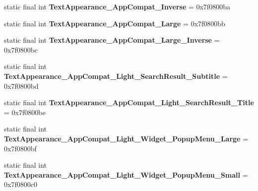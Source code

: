 \begin{DoxyCompactItemize}
\item 
\hypertarget{classandroid_1_1support_1_1design_1_1_r_1_1style_acc2c875b4af6beac9360f42572c25d9a}{}static final int {\bfseries Text\+Appearance\+\_\+\+App\+Compat\+\_\+\+Inverse} = 0x7f0800ba\label{classandroid_1_1support_1_1design_1_1_r_1_1style_acc2c875b4af6beac9360f42572c25d9a}

\item 
\hypertarget{classandroid_1_1support_1_1design_1_1_r_1_1style_ad3d980817c920614b02aac4354be82e7}{}static final int {\bfseries Text\+Appearance\+\_\+\+App\+Compat\+\_\+\+Large} = 0x7f0800bb\label{classandroid_1_1support_1_1design_1_1_r_1_1style_ad3d980817c920614b02aac4354be82e7}

\item 
\hypertarget{classandroid_1_1support_1_1design_1_1_r_1_1style_a12013c3ce690759654e8b1a05327e0c9}{}static final int {\bfseries Text\+Appearance\+\_\+\+App\+Compat\+\_\+\+Large\+\_\+\+Inverse} = 0x7f0800bc\label{classandroid_1_1support_1_1design_1_1_r_1_1style_a12013c3ce690759654e8b1a05327e0c9}

\item 
\hypertarget{classandroid_1_1support_1_1design_1_1_r_1_1style_ab6a60e6b39b2f6c94adbf6523ca0ddf7}{}static final int {\bfseries Text\+Appearance\+\_\+\+App\+Compat\+\_\+\+Light\+\_\+\+Search\+Result\+\_\+\+Subtitle} = 0x7f0800bd\label{classandroid_1_1support_1_1design_1_1_r_1_1style_ab6a60e6b39b2f6c94adbf6523ca0ddf7}

\item 
\hypertarget{classandroid_1_1support_1_1design_1_1_r_1_1style_ad43f8905df9054ea1c5ee01caaa9aae2}{}static final int {\bfseries Text\+Appearance\+\_\+\+App\+Compat\+\_\+\+Light\+\_\+\+Search\+Result\+\_\+\+Title} = 0x7f0800be\label{classandroid_1_1support_1_1design_1_1_r_1_1style_ad43f8905df9054ea1c5ee01caaa9aae2}

\item 
\hypertarget{classandroid_1_1support_1_1design_1_1_r_1_1style_a0ab8d102e79fb4df376280670f497119}{}static final int {\bfseries Text\+Appearance\+\_\+\+App\+Compat\+\_\+\+Light\+\_\+\+Widget\+\_\+\+Popup\+Menu\+\_\+\+Large} = 0x7f0800bf\label{classandroid_1_1support_1_1design_1_1_r_1_1style_a0ab8d102e79fb4df376280670f497119}

\item 
\hypertarget{classandroid_1_1support_1_1design_1_1_r_1_1style_a51f65809127f437f963c959df41f55ca}{}static final int {\bfseries Text\+Appearance\+\_\+\+App\+Compat\+\_\+\+Light\+\_\+\+Widget\+\_\+\+Popup\+Menu\+\_\+\+Small} = 0x7f0800c0\label{classandroid_1_1support_1_1design_1_1_r_1_1style_a51f65809127f437f963c959df41f55ca}


\end{DoxyCompactItemize}
